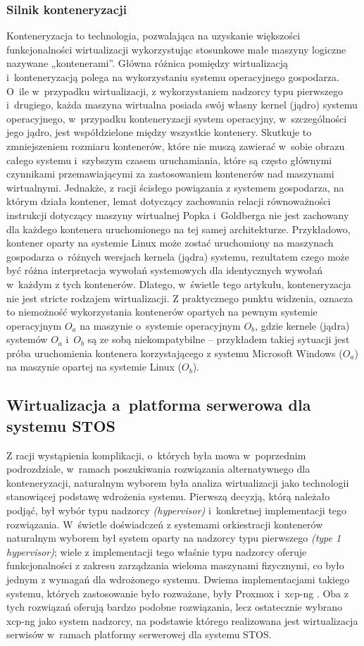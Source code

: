 \subsubsection{Silnik konteneryzacji}
Konteneryzacja to technologia, pozwalająca na uzyskanie większości funkcjonalności wirtualizacji wykorzystując stosunkowe małe maszyny logiczne nazywane „kontenerami”. Główna różnica pomiędzy wirtualizacją i~konteneryzacją polega na wykorzystaniu systemu operacyjnego gospodarza. O~ile w~przypadku wirtualizacji, z wykorzystaniem nadzorcy typu pierwszego i~drugiego, każda maszyna wirtualna posiada swój własny kernel (jądro) systemu operacyjnego, w~przypadku konteneryzacji system operacyjny, w~szczególności jego jądro, jest współdzielone między wszystkie kontenery. Skutkuje to zmniejszeniem rozmiaru kontenerów, które nie muszą zawierać w~sobie obrazu całego systemu i~szybszym czasem uruchamiania, które są często głównymi czynnikami przemawiającymi za zastosowaniem kontenerów nad maszynami wirtualnymi. Jednakże, z racji ścisłego powiązania z systemem gospodarza, na którym działa kontener, lemat dotyczący zachowania relacji równoważności instrukcji dotyczący maszyny wirtualnej Popka i~Goldberga \cite{virtualization} nie jest zachowany dla każdego kontenera uruchomionego na tej samej architekturze. Przykładowo, kontener oparty na systemie Linux może zostać uruchomiony na maszynach gospodarza o~różnych wersjach kernela (jądra) systemu, rezultatem czego może być różna interpretacja wywołań systemowych dla identycznych wywołań w~każdym z tych kontenerów. Dlatego, w~świetle tego artykułu, konteneryzacja nie jest stricte rodzajem wirtualizacji. Z praktycznego punktu widzenia, oznacza to niemożność wykorzystania kontenerów opartych na pewnym systemie operacyjnym $O_a$ na maszynie o~systemie operacyjnym $O_b$, gdzie kernele (jądra) systemów $O_a$ i~$O_b$ są ze sobą niekompatybilne -- przykładem takiej sytuacji jest próba uruchomienia kontenera korzystającego z systemu Microsoft Windows ($O_a$) na maszynie opartej na systemie Linux ($O_b$).

\subsection{Wirtualizacja a~platforma serwerowa dla systemu STOS}
Z racji wystąpienia komplikacji, o~których była mowa w~poprzednim podrozdziale, w~ramach poszukiwania rozwiązania alternatywnego dla konteneryzacji, naturalnym wyborem była analiza wirtualizacji jako technologii stanowiącej podstawę wdrożenia systemu. Pierwszą decyzją, którą należało podjąć, był wybór typu nadzorcy \textit{(hypervisor)} i~konkretnej implementacji tego rozwiązania. W~świetle doświadczeń z systemami orkiestracji kontenerów naturalnym wyborem był system oparty na nadzorcy typu pierwszego \textit{(type 1 hypervisor)}; wiele z implementacji tego właśnie typu nadzorcy oferuje funkcjonalności z zakresu zarządzania wieloma maszynami fizycznymi, co było jednym z wymagań dla wdrożonego systemu. Dwiema implementacjami takiego systemu, których zastosowanie było rozważane, były Proxmox i~xcp-ng \cite{proxmox, xcp}. Oba z tych rozwiązań oferują bardzo podobne rozwiązania, lecz ostatecznie wybrano xcp-ng jako system nadzorcy, na podstawie którego realizowana jest wirtualizacja serwisów w~ramach platformy serwerowej dla systemu STOS.
